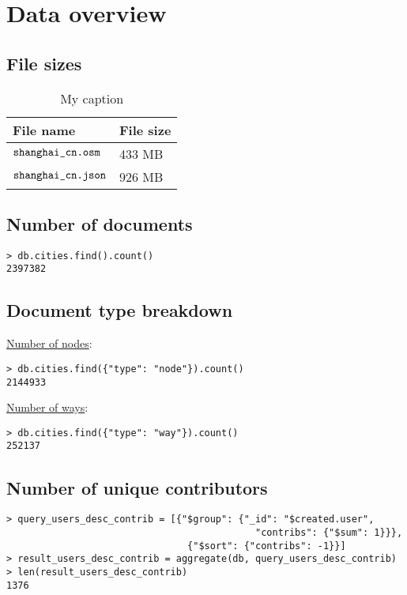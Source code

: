 \documentclass{article}
\begin{document}
\section{Data overview}
\subsection{File sizes}
\newpage
\begin{table}[]
\centering
\caption{My caption}
\label{my-label}
\begin{tabular}{|l|l|}
\hline
File name                 & File size \\ \hline
$\verb+shanghai_cn.osm+$  & 433 MB    \\ \hline
$\verb+shanghai_cn.json+$ & 926 MB    \\ \hline
\end{tabular}
\end{table}

\subsection{Number of documents}
\begin{verbatim}
> db.cities.find().count()
2397382
\end{verbatim}

\subsection{Document type breakdown}
\underline{Number of nodes}:
\begin{verbatim}
> db.cities.find({"type": "node"}).count()
2144933
\end{verbatim}

\underline{Number of ways}:
\begin{verbatim}
> db.cities.find({"type": "way"}).count()
252137
\end{verbatim}

\subsection{Number of unique contributors}
\begin{verbatim}
> query_users_desc_contrib = [{"$group": {"_id": "$created.user",
                                            "contribs": {"$sum": 1}}},
                                {"$sort": {"contribs": -1}}]
> result_users_desc_contrib = aggregate(db, query_users_desc_contrib)
> len(result_users_desc_contrib)
1376
\end{verbatim}
\end{document}
